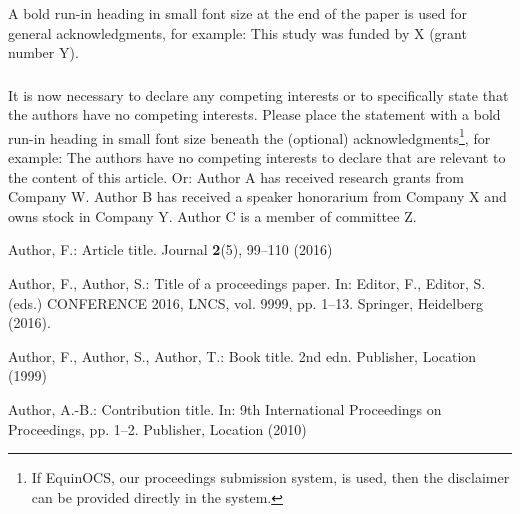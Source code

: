 \documentclass[runningheads]{llncs}
\begin{document}
\begin{credits}
\subsubsection{\ackname} A bold run-in heading in small font size at the end of the paper is
used for general acknowledgments, for example: This study was funded
by X (grant number Y).

\subsubsection{\discintname}
It is now necessary to declare any competing interests or to specifically
state that the authors have no competing interests. Please place the
statement with a bold run-in heading in small font size beneath the
(optional) acknowledgments\footnote{If EquinOCS, our proceedings submission
system, is used, then the disclaimer can be provided directly in the system.},
for example: The authors have no competing interests to declare that are
relevant to the content of this article. Or: Author A has received research
grants from Company W. Author B has received a speaker honorarium from
Company X and owns stock in Company Y. Author C is a member of committee Z.
\end{credits}
%
%
%
% 
% 
%
\begin{thebibliography}{8}
Author, F.: Article title. Journal \textbf{2}(5), 99--110 (2016)

Author, F., Author, S.: Title of a proceedings paper. In: Editor,
F., Editor, S. (eds.) CONFERENCE 2016, LNCS, vol. 9999, pp. 1--13.
Springer, Heidelberg (2016). 

Author, F., Author, S., Author, T.: Book title. 2nd edn. Publisher,
Location (1999)

Author, A.-B.: Contribution title. In: 9th International Proceedings
on Proceedings, pp. 1--2. Publisher, Location (2010)

\end{thebibliography}
\end{document}
